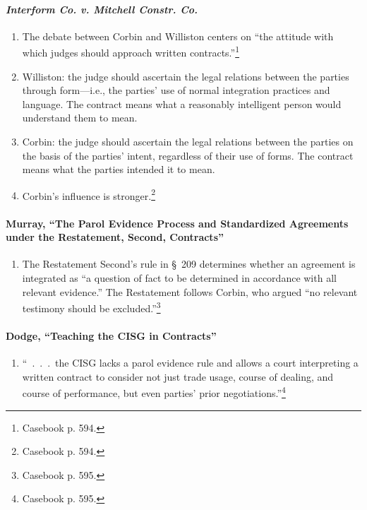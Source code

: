 \paragraph{\emph{Interform Co. v. Mitchell Constr. Co.}}

\begin{enumerate}
    \item The debate between Corbin and Williston centers on ``the attitude 
    with which judges should approach written contracts.''\footnote{Casebook 
    p. 594.}
    \item Williston: the judge should ascertain the legal relations between 
    the parties through form---i.e., the parties' use of normal integration 
    practices and language. The contract means what a reasonably intelligent 
    person would understand them to mean.
    \item Corbin: the judge should ascertain the legal relations between the 
    parties on the basis of the parties' intent, regardless of their use of 
    forms. The contract means what the parties intended it to mean.
    \item Corbin's influence is stronger.\footnote{Casebook p. 594.}
\end{enumerate}

\paragraph{Murray, ``The Parol Evidence Process and Standardized Agreements 
under the Restatement, Second, Contracts''}

\begin{enumerate}
    \item The Restatement Second's rule in \S\ 209 determines  whether an 
    agreement is integrated as ``a question of fact to be determined in 
    accordance with all relevant evidence.'' The Restatement follows Corbin, 
    who argued ``no relevant testimony should be excluded.''\footnote{Casebook 
    p. 595.}
\end{enumerate}

\paragraph{Dodge, ``Teaching the CISG in Contracts''}

\begin{enumerate}
    \item ``~.~.~.~the CISG lacks a parol evidence rule and allows a court 
    interpreting a written contract to consider not just trade usage, course 
    of dealing, and course of performance, but even parties' prior 
    negotiations.''\footnote{Casebook p. 595.}
\end{enumerate}

